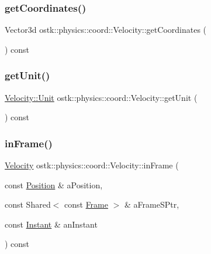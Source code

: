 \mbox{\label{classostk_1_1physics_1_1coord_1_1_velocity_a50636bdf695b2765ea94a5b76258ebc3}} 
\subsubsection{\texorpdfstring{get\+Coordinates()}{getCoordinates()}}
{\footnotesize\ttfamily Vector3d ostk\+::physics\+::coord\+::\+Velocity\+::get\+Coordinates (\begin{DoxyParamCaption}{ }\end{DoxyParamCaption}) const}

\mbox{\label{classostk_1_1physics_1_1coord_1_1_velocity_ae512730ddb567de93fe9f77e116557a0}} 
\subsubsection{\texorpdfstring{get\+Unit()}{getUnit()}}
{\footnotesize\ttfamily \hyperlink{classostk_1_1physics_1_1coord_1_1_velocity_a01701e56094328a31d0211da5ac1ba28}{Velocity\+::\+Unit} ostk\+::physics\+::coord\+::\+Velocity\+::get\+Unit (\begin{DoxyParamCaption}{ }\end{DoxyParamCaption}) const}

\mbox{\label{classostk_1_1physics_1_1coord_1_1_velocity_aedf31d29406d85a2d302e7a5d51af4f3}} 
\subsubsection{\texorpdfstring{in\+Frame()}{inFrame()}}
{\footnotesize\ttfamily \hyperlink{classostk_1_1physics_1_1coord_1_1_velocity}{Velocity} ostk\+::physics\+::coord\+::\+Velocity\+::in\+Frame (\begin{DoxyParamCaption}\item[{const \hyperlink{classostk_1_1physics_1_1coord_1_1_position}{Position} \&}]{a\+Position,  }\item[{const Shared$<$ const \hyperlink{classostk_1_1physics_1_1coord_1_1_frame}{Frame} $>$ \&}]{a\+Frame\+S\+Ptr,  }\item[{const \hyperlink{classostk_1_1physics_1_1time_1_1_instant}{Instant} \&}]{an\+Instant }\end{DoxyParamCaption}) const}


